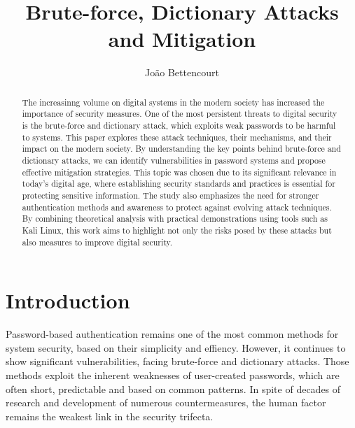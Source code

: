 \documentclass{comjnl}
\begin{document}
\author{João Bettencourt}
\title{Brute-force, Dictionary Attacks and Mitigation}
 

 



\begin{abstract}
The increasinng volume on digital systems in the modern society has increased the importance of security measures.
One of the most persistent threats to digital security is the brute-force and dictionary attack, which exploits weak passwords to be harmful to systems. 
This paper explores these attack techniques, their mechanisms, and their impact on the modern society. 
By understanding the key points behind brute-force and dictionary attacks, we can identify vulnerabilities in password systems and propose effective mitigation strategies. 
This topic was chosen due to its significant relevance in today's digital age, where establishing security standards and practices is essential for protecting sensitive information.
The study also emphasizes the need for stronger authentication methods and awareness to protect against evolving attack techniques. 
By combining theoretical analysis with practical demonstrations using tools such as Kali Linux, this work aims to highlight not only the risks posed by these attacks but also measures to improve digital security.
\end{abstract}

\maketitle


\section{Introduction}
\label{Sec:Sklicnapoglavje}
Password-based authentication remains one of the most common methods for system security, based on their simplicity and effiency. However, it continues to show significant vulnerabilities, facing brute-force and dictionary attacks. Those methods exploit the inherent weaknesses of user-created passwords, which are often short, predictable and based on common patterns. In spite of decades of research and development of numerous countermeasures, the human factor remains the weakest link in the security trifecta.
\end{document}
